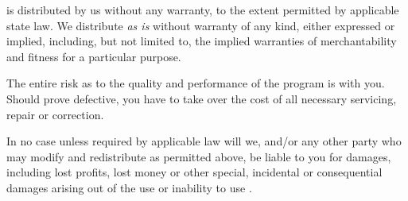 \LiDIA is distributed by us without any warranty, to the extent permitted by applicable state
law.  We distribute \LiDIA \emph{as is} without warranty of any kind, either expressed or
implied, including, but not limited to, the implied warranties of merchantability and fitness
for a particular purpose.

The entire risk as to the quality and performance of the program is with you.  Should \LiDIA
prove defective, you have to take over the cost of all necessary servicing, repair or
correction.

In no case unless required by applicable law will we, and/or any other party who may modify and
redistribute \LiDIA as permitted above, be liable to you for damages, including lost profits,
lost money or other special, incidental or consequential damages arising out of the use or
inability to use \LiDIA.
